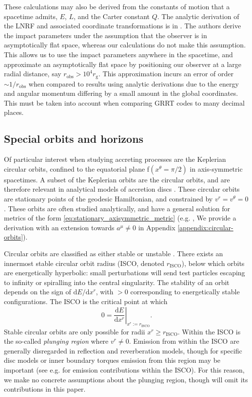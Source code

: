 \documentclass[fleqn,usenatbib]{mnras}
\renewcommand{\d}{\text{d}}
\newcommand{\rg}{r_\text{g}}
\newcommand{\risco}{r_\text{ISCO}}
\begin{document}
These calculations may also be derived from the constants of motion that a
spacetime admits, $E$, $L$, and the Carter constant $Q$. The analytic
derivation of the LNRF and associated coordinate transformations is in
\cite{cunningham_optical_1973}. The authors derive the impact parameters under
the assumption that the observer is in asymptotically flat space, whereas our
calculations do not make this assumption. This allows us to use the impact
parameters anywhere in the spacetime, and approximate an asymptotically flat
space by positioning our observer at a large radial distance, say $r_\text{obs}
> 10^4 \rg$. This approximation incurs an error of order $\sim1/r_\text{obs}$
when compared to results using analytic derivations due to the energy and
angular momentum differing by a small amount in the global coordinates. This
must be taken into account when comparing GRRT codes to many decimal places.

\subsection{Special orbits and horizons}
\label{sec:special-orbits}

Of particular interest when studying accreting processes are the Keplerian
circular orbits, confined to the equatorial plane f$(x^\theta = \pi/2)$ in
axis-symmetric spacetimes. A subset of the Keplerian orbits are the circular
orbits, and are therefore relevant in analytical models of accretion discs
\citep{shakura_black_1973}. These circular orbits are stationary points of the
geodesic Hamiltonian, and constrained by $v^r = v^\theta = 0$.  These orbits are
often studied analytically, and have a general solution for metrics of the form
\eqref{eq:stationary_axisymmetric_metric} (e.g. \citealp{johannsen_regular_2013},
We provide a derivation with an extension towards $a^\mu \neq 0$ in Appendix
\ref{appendix:circular-orbits}).

Circular orbits are classified as either stable or unstable
\citep{wilkins_bound_1972,bardeen_rotating_1972}. There exists an innermost
stable circular orbit radius (ISCO, denoted $\risco$), below which orbits
are energetically hyperbolic: small perturbations will send test particles
escaping to infinity or spiralling into the central singularity. The stability of
an orbit depends on the sign of $\d E / \d x^r$, with $>0$ corresponding to
energetically stable configurations. The ISCO is the critical point at
which
\begin{equation}
    \label{eq:isco-definition}
    0 = \left. \frac{\d E}{\d x^r} \right\rvert_{x^r := \risco}.
\end{equation}
Stable circular orbits are only possible for radii $x^r \geq \risco$.  Within
the ISCO is the so-called \textit{plunging region} where $v^r \neq 0$.  Emission
from within the ISCO are generally disregarded in reflection and reverberation
models, though for specific disc models or inner boundary torques emission from
this region may be important (see e.g. \citealp{mummery_continuum_2024} for
emission contributions within the ISCO). For this reason, we make no concrete
assumptions about the plunging region, though will omit its contributions in
this paper.
\end{document}
